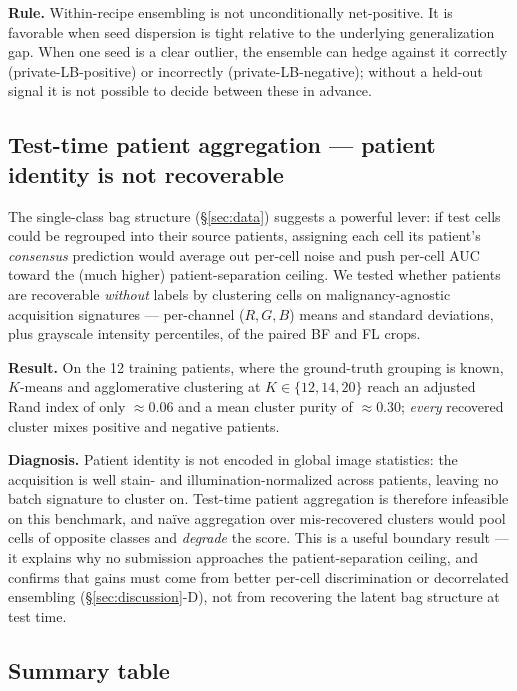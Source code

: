 \documentclass[conference]{IEEEtran}
\begin{document}
\textbf{Rule.} Within-recipe ensembling is not unconditionally net-positive. It is favorable when seed dispersion is tight relative to the underlying generalization gap. When one seed is a clear outlier, the ensemble can hedge against it correctly (private-LB-positive) or incorrectly (private-LB-negative); without a held-out signal it is not possible to decide between these in advance.

\subsection{Test-time patient aggregation --- patient identity is not recoverable}

The single-class bag structure (\S\ref{sec:data}) suggests a powerful lever: if test cells could be regrouped into their source patients, assigning each cell its patient's \emph{consensus} prediction would average out per-cell noise and push per-cell AUC toward the (much higher) patient-separation ceiling. We tested whether patients are recoverable \emph{without} labels by clustering cells on malignancy-agnostic acquisition signatures --- per-channel ($R,G,B$) means and standard deviations, plus grayscale intensity percentiles, of the paired BF and FL crops.

\textbf{Result.} On the 12 training patients, where the ground-truth grouping is known, $K$-means and agglomerative clustering at $K \in \{12, 14, 20\}$ reach an adjusted Rand index of only $\approx 0.06$ and a mean cluster purity of $\approx 0.30$; \emph{every} recovered cluster mixes positive and negative patients.

\textbf{Diagnosis.} Patient identity is not encoded in global image statistics: the acquisition is well stain- and illumination-normalized across patients, leaving no batch signature to cluster on. Test-time patient aggregation is therefore infeasible on this benchmark, and na\"ive aggregation over mis-recovered clusters would pool cells of opposite classes and \emph{degrade} the score. This is a useful boundary result --- it explains why no submission approaches the patient-separation ceiling, and confirms that gains must come from better per-cell discrimination or decorrelated ensembling (\S\ref{sec:discussion}-D), not from recovering the latent bag structure at test time.

\subsection{Summary table}
\end{document}
